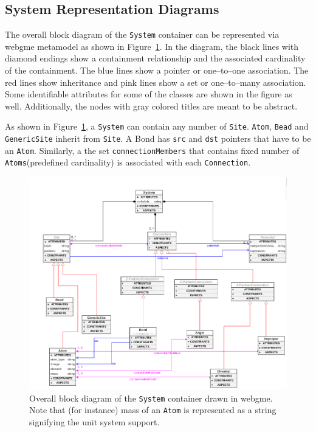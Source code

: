 \documentclass[12pt]{article}
\begin{document}
\subsection{System Representation Diagrams}
The overall block diagram of the \texttt{System} container can be represented via webgme metamodel as shown in Figure~\ref{fig:TopoDiagram}. In the diagram, the black lines with diamond endings show a containment relationship and the associated cardinality of the containment. The blue lines show a pointer or one--to--one association. The red lines show inheritance and pink lines show a set or one--to--many association. Some identifiable attributes for some of the classes are shown in the figure as well. Additionally, the nodes with gray colored titles are meant to be abstract.

As shown in Figure~\ref{fig:TopoDiagram}, a \texttt{System} can contain any number of \texttt{Site}. \texttt{Atom}, \texttt{Bead} and \texttt{GenericSite} inherit from \texttt{Site}. A Bond has \texttt{src} and \texttt{dst} pointers that have to be an \texttt{Atom}. Similarly, a the set \texttt{connectionMembers} that contains fixed number of \texttt{Atoms}(predefined cardinality) is associated with each \texttt{Connection}.

\begin{figure}[ht]
    \centering
    \includegraphics[width=\textwidth]{docs/topo}
    \caption{Overall block diagram of the \texttt{System} container drawn in webgme. Note that (for instance) mass of an \texttt{Atom} is represented as a string signifying the unit system support.}
    \label{fig:TopoDiagram}
\end{figure}
\end{document}
